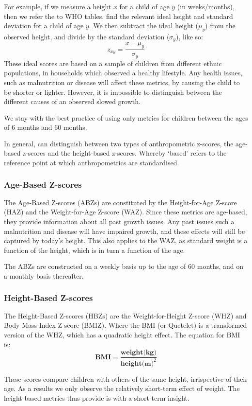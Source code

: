 \begin{refsection}
For example, if we measure a height $x$ for a child of age $y$ (in weeks/months),
then we refer the to WHO tables, find the relevant ideal height and standard deviation for a child of age $y$.
We then subtract the ideal height ($\mu_y$) from the observed height,
and divide by the standard deviation ($\sigma_y$), like so:
\[
z_{xy} = \frac{x - \mu_y}{\sigma_{y}}
\]
These ideal scores are based on a sample of children from different ethnic populations,
in households which observed a healthy lifestyle.
Any health issues, such as malnutrition or disease will affect these metrics,
by causing the child to be shorter or lighter.
However, it is impossible to distinguish between the different causes of an observed slowed growth.

We stay with the best practice of using only metrics for children between the ages of 6 months and 60 months.

In general, can distinguish between two types of anthropometric z-scores, the age-based z-scores and the height-based z-scores.
Whereby `based' refers to the reference point at which anthropometrics are standardised.

\subsubsection{Age-Based Z-scores}
The Age-Based Z-scores (ABZs) are constituted by the Height-for-Age Z-score (HAZ) and the Weight-for-Age Z-score (WAZ).
Since these metrics are age-based, they provide information about all past growth issues.
Any past issues such a malnutrition and disease will have impaired growth,
and these effects will still be captured by today's height.
This also applies to the WAZ, as standard weight is a function of the height,
which is in turn a function of the age.

The ABZs are constructed on a weekly basis up to the age of 60 months, and on a monthly basis thereafter.


\subsubsection{Height-Based Z-scores}
\label{sa:hbz}
The Height-Based Z-scores (HBZs) are the Weight-for-Height Z-score (WHZ)
and Body Mass Index Z-score (BMIZ).
Where the BMI (or Quetelet) is a transformed version of the WHZ, which has a quadratic height effect.
The equation for BMI is:
\[
\textbf{BMI} = \frac{\textbf{weight(kg)}}{\textbf{height(m)}^2}
\]

These scores compare children with others of the same height, irrispective of their age.
As a results we only observe the relatively short-term effect of weight.
The height-based metrics thus provide is with a short-term insight.


\end{refsection}
